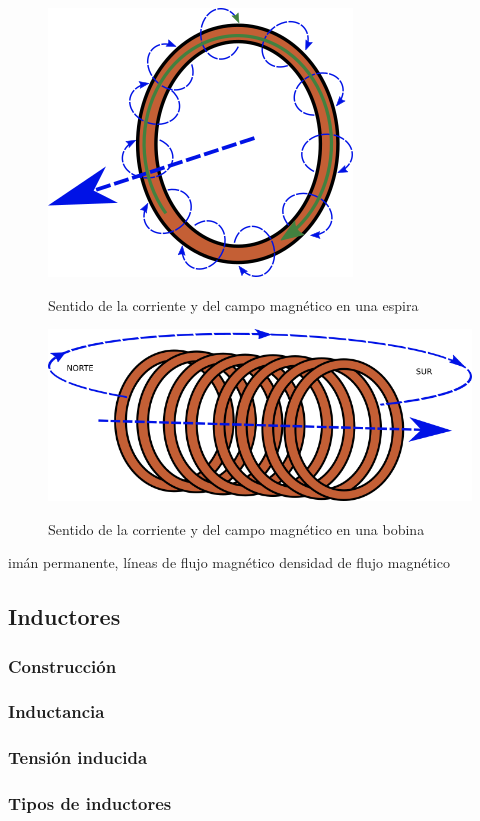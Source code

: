 \begin{figure}
	\centering
		\includegraphics[scale=0.5]{images/electroiman-espira}
	\label{fig:electroiman-espira}
	\caption{Sentido de la corriente y del campo magnético en una espira}
\end{figure}

\begin{figure}
	\centering
		\includegraphics[scale=0.5]{images/electroiman-bobina}
	\label{fig:electroiman-bobina}
	\caption{Sentido de la corriente y del campo magnético en una bobina}
\end{figure}
imán permanente, líneas de flujo magnético
densidad de flujo magnético
\subsection{Inductores}
\subsubsection{Construcción}
\subsubsection{Inductancia}
\subsubsection{Tensión inducida}
\subsubsection{Tipos de inductores}
